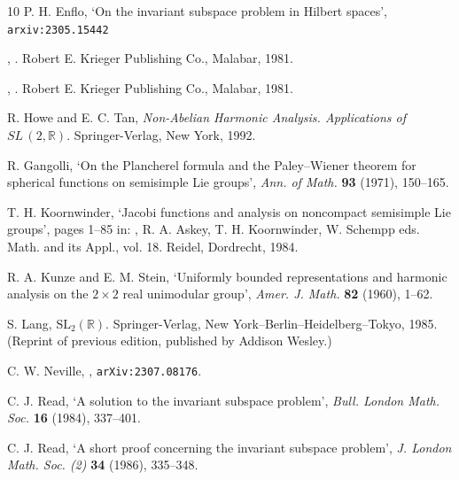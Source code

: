 \documentclass[12pt,a4paper]{amsart}
\theoremstyle{definition}
\theoremstyle{remark}
\numberwithin{equation}{section}
\newcommand{\R}{\mathbb{R}}
\begin{document}
\begin{thebibliography}{10}
P. H. Enflo,
`On the invariant subspace problem in Hilbert spaces',
\texttt{arxiv:2305.15442}


,
.
Robert E. Krieger Publishing Co.,  Malabar,  1981.

,
.
Robert E. Krieger Publishing Co.,  Malabar,  1981.
  

R. Howe and E. C. Tan,
\textit{Non-Abelian Harmonic Analysis. Applications of $SL\,(2,\R)$}.
Springer-Verlag, New York, 1992.

R. Gangolli,
`On the {P}lancherel formula and the {P}aley--{W}iener theorem for spherical functions on
semisimple {L}ie groups',
\textit{Ann. of Math.} \textbf{93} (1971), 150--165.

T. H. Koornwinder,
`Jacobi functions and analysis on noncompact semisimple Lie groups',
pages 1--85 in: 
, 
R. A. Askey, T. H. Koornwinder, W. Schempp eds.
Math. and its Appl., vol. 18. 
Reidel, Dordrecht, 1984.

R. A. Kunze and E. M. Stein,
‘Uniformly bounded representations and harmonic analysis on the $2 \times 2$
real unimodular group’, 
\textit{Amer. J. Math.} \textbf{82} (1960), 1--62.

S. Lang,
$\mathrm{SL}_2(\mathbb{R})$.
Springer-Verlag, New York--Berlin--Heidelberg--Tokyo, 1985.
(Reprint of previous edition, published by Addison Wesley.)


C. W. Neville,  
,
\texttt{arXiv:2307.08176}.

C. J. Read, 
`A solution to the invariant subspace problem', 
\textit{Bull. London Math. Soc.} \textbf{16} (1984), 337--401.

C. J. Read, 
`A short proof concerning the invariant subspace problem', 
\textit{J. London Math. Soc. (2)} \textbf{34} (1986), 335--348.



\end{thebibliography}
\end{document}
